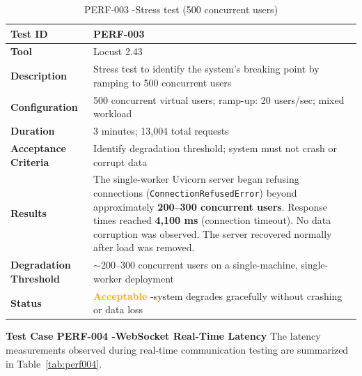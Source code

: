 \begin{table}[H]
\caption{PERF-003 -Stress test (500 concurrent users)}
\centering
\begin{tabular}{|l|p{10cm}|}
\hline
\textbf{Test ID} & PERF-003 \\
\hline
\textbf{Tool} & Locust 2.43 \\
\hline
\textbf{Description} & Stress test to identify the system's breaking point by ramping to 500 concurrent users \\
\hline
\textbf{Configuration} & 500 concurrent virtual users; ramp-up: 20 users/sec; mixed workload \\
\hline
\textbf{Duration} & 3 minutes; 13,004 total requests \\
\hline
\textbf{Acceptance Criteria} & Identify degradation threshold; system must not crash or corrupt data \\
\hline
\textbf{Results} & The single-worker Uvicorn server began refusing connections (\texttt{ConnectionRefusedError}) beyond approximately \textbf{200--300 concurrent users}. Response times reached \textbf{4,100 ms} (connection timeout). No data corruption was observed. The server recovered normally after load was removed. \\
\hline
\textbf{Degradation Threshold} & $\sim$200--300 concurrent users on a single-machine, single-worker deployment \\
\hline
\textbf{Status} & \textcolor{orange}{\textbf{Acceptable}} -system degrades gracefully without crashing or data loss \\
\hline
\end{tabular}

\label{tab:perf003}
\end{table}

\textbf{Test Case PERF-004 -WebSocket Real-Time Latency}
The latency measurements observed during real-time communication testing are summarized in Table~\ref{tab:perf004}.

